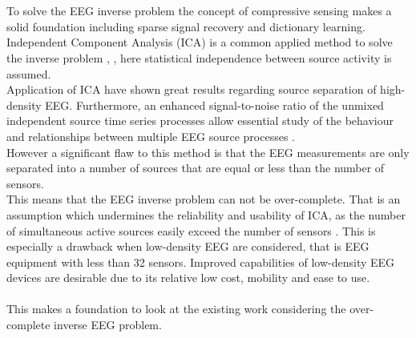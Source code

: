 \\
\\
To solve the EEG inverse problem the concept of compressive sensing makes a solid foundation including sparse signal recovery and dictionary learning. Independent Component Analysis (ICA) is a common applied method to solve the inverse problem \cite{Scott1996}, \cite{Scott1997}, here statistical independence between source activity is assumed. 
\\
Application of ICA have shown great results regarding source separation of high-density EEG. Furthermore, an enhanced signal-to-noise ratio of the unmixed independent source time series processes allow essential study of the behaviour and relationships between multiple EEG source processes \cite{Arnaud2012}. 
\\
However a significant flaw to this method is that the EEG measurements are only separated into a number of sources that are equal or less than the number of sensors.
\\
This means that the EEG inverse problem can not be over-complete. That is an assumption which undermines the reliability and usability of ICA, as the number of simultaneous active sources easily exceed the number of sensors \cite{phd2015}. This is especially a drawback when low-density EEG are considered, that is EEG equipment with less than 32 sensors. Improved capabilities of low-density EEG devices are desirable due to its relative low cost, mobility and ease to use. 
\\  
\\
This makes a foundation to look at the existing work considering the over-complete inverse EEG problem. 

